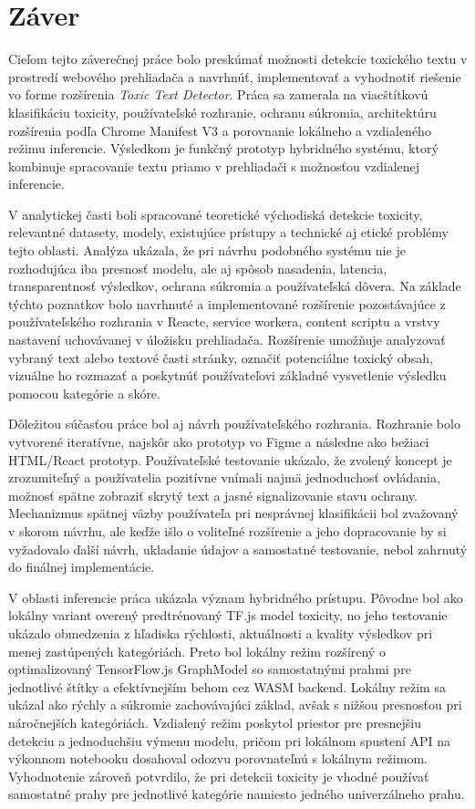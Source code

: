 
\chapter{Záver}

Cieľom tejto záverečnej práce bolo preskúmať možnosti detekcie toxického textu v prostredí webového prehliadača a navrhnúť, implementovať a vyhodnotiť riešenie vo forme rozšírenia \textit{Toxic Text Detector}. Práca sa zamerala na viacštítkovú klasifikáciu toxicity, používateľské rozhranie, ochranu súkromia, architektúru rozšírenia podľa Chrome Manifest V3 a porovnanie lokálneho a vzdialeného režimu inferencie. Výsledkom je funkčný prototyp hybridného systému, ktorý kombinuje spracovanie textu priamo v prehliadači s možnosťou vzdialenej inferencie.

V analytickej časti boli spracované teoretické východiská detekcie toxicity, relevantné datasety, modely, existujúce prístupy a technické aj etické problémy tejto oblasti. Analýza ukázala, že pri návrhu podobného systému nie je rozhodujúca iba presnosť modelu, ale aj spôsob nasadenia, latencia, transparentnosť výsledkov, ochrana súkromia a používateľská dôvera. Na základe týchto poznatkov bolo navrhnuté a implementované rozšírenie pozostávajúce z používateľského rozhrania v Reacte, service workera, content scriptu a vrstvy nastavení uchovávanej v úložisku prehliadača. Rozšírenie umožňuje analyzovať vybraný text alebo textové časti stránky, označiť potenciálne toxický obsah, vizuálne ho rozmazať a poskytnúť používateľovi základné vysvetlenie výsledku pomocou kategórie a skóre.

Dôležitou súčasťou práce bol aj návrh používateľského rozhrania. Rozhranie bolo vytvorené iteratívne, najskôr ako prototyp vo Figme a následne ako bežiaci HTML/React prototyp. Používateľské testovanie ukázalo, že zvolený koncept je zrozumiteľný a používatelia pozitívne vnímali najmä jednoduchosť ovládania, možnosť spätne zobraziť skrytý text a jasné signalizovanie stavu ochrany. Mechanizmus spätnej väzby používateľa pri nesprávnej klasifikácii bol zvažovaný v skorom návrhu, ale keďže išlo o voliteľné rozšírenie a jeho dopracovanie by si vyžadovalo ďalší návrh, ukladanie údajov a samostatné testovanie, nebol zahrnutý do finálnej implementácie.

V oblasti inferencie práca ukázala význam hybridného prístupu. Pôvodne bol ako lokálny variant overený predtrénovaný TF.js model toxicity, no jeho testovanie ukázalo obmedzenia z hľadiska rýchlosti, aktuálnosti a kvality výsledkov pri menej zastúpených kategóriách. Preto bol lokálny režim rozšírený o optimalizovaný TensorFlow.js GraphModel so samostatnými prahmi pre jednotlivé štítky a efektívnejším behom cez WASM backend. Lokálny režim sa ukázal ako rýchly a súkromie zachovávajúci základ, avšak s nižšou presnosťou pri náročnejších kategóriách. Vzdialený režim poskytol priestor pre presnejšiu detekciu a jednoduchšiu výmenu modelu, pričom pri lokálnom spustení API na výkonnom notebooku dosahoval odozvu porovnateľnú s lokálnym režimom. Vyhodnotenie zároveň potvrdilo, že pri detekcii toxicity je vhodné používať samostatné prahy pre jednotlivé kategórie namiesto jedného univerzálneho prahu.

